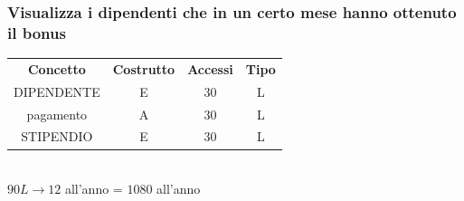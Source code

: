 \documentclass[11pt]{article}
\begin{document}
\subsubsection{Visualizza i dipendenti che in un certo mese hanno ottenuto il
bonus} 

\begin{table}[H]
    \centering
    \begin{tabular}{ c c c c } 
        \rowcolor{red!20!}
        \textbf{Concetto} & \textbf{Costrutto} & \textbf{Accessi} &
        \textbf{Tipo}\\ 
        DIPENDENTE & E & 30 & L \\ 
        pagamento & A & 30 & L \\
        STIPENDIO & E & 30 & L \\ 
    \end{tabular}\\
    \( 90L \rightarrow 12 \) all'anno = \( 1080 \) all'anno
\end{table}
\end{document}
